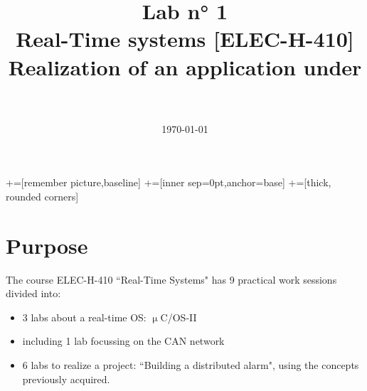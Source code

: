 \documentclass[10pt,a4paper]{article}
\date{\vspace{-1cm}\mydate\today}
\title{\vspace{-2cm} Lab n° 1\\ Real-Time systems [ELEC-H-410]\\ Realization of an application under \uCOSII~\ifthenelse{\boolean{corrige}}{~\\Corrigé}{}}
\theoremstyle{definition}%
\newcommand{\uCOSII}{$\upmu$C/OS-II}
\begin{document}
\newcommand\tabnode[1]{\addtocounter{nodecount}{1} \tikz \node (\arabic{nodecount}) {#1};}

+=[remember picture,baseline]
+=[inner sep=0pt,anchor=base]
+=[thick, rounded corners]



\maketitle
\section*{Purpose}
The course ELEC-H-410 ``Real-Time Systems" has 9 practical work sessions divided into:
\begin{itemize}
\item 3 labs about a real-time OS: \uCOSII~
\item including 1 lab focussing on the CAN network
\item 6 labs to realize a project: ``Building a distributed alarm", using the concepts
previously acquired.
\end{itemize}



 
\end{document}
